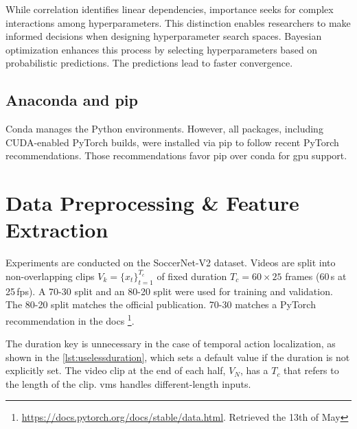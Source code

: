 While correlation identifies linear dependencies, importance seeks for complex interactions among hyperparameters. This distinction enables researchers to make informed decisions when designing hyperparameter search spaces. Bayesian optimization enhances this process by selecting hyperparameters based on probabilistic predictions. The predictions lead to faster convergence.

\subsection{Anaconda and pip}
\label{ssec:conda_pip}
Conda manages the Python environments. However, all packages, including CUDA-enabled PyTorch builds, were installed via pip to follow recent PyTorch recommendations. Those recommendations favor pip over conda for \acrshort{gpu} support.

\section{Data Preprocessing \& Feature Extraction}
\label{sec:preprocessing}

Experiments are conducted on the SoccerNet-V2 dataset\cite{deliege_soccernet-v2_dataset_2021}. Videos are split into non-overlapping clips $V_k=\{x_t\}_{t=1}^{T_c}$ of fixed duration $T_c=60\!\times\!25$ frames (60\,s at 25\,fps). A 70-30 split and an 80-20 split were used for training and validation. The 80-20 split matches the official publication. 70-30 matches a PyTorch recommendation in the docs \footnote{\url{https://docs.pytorch.org/docs/stable/data.html}. Retrieved the 13th of May}.





The duration key is unnecessary in the case of temporal action localization, as shown in the \autoref{lst:uselessduration}, which sets a default value if the duration is not explicitly set. The video clip at the end of each half, $V_{N}$, has a $T_c$ that refers to the length of the clip. \acrfull{vms} handles different-length inputs. 



